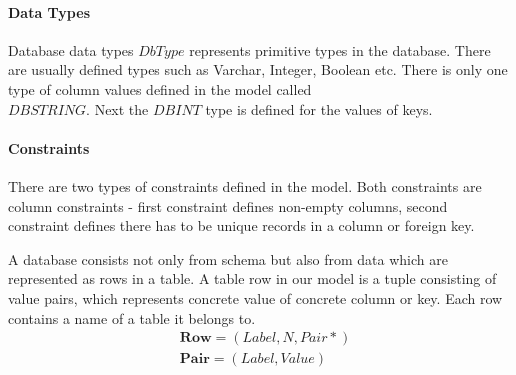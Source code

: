 \documentclass[runningheads]{comsis}
\begin{document}
\paragraph{Data Types} Database data types $DbType$ represents primitive types in the database. There are usually defined types such as Varchar, Integer, Boolean etc. There is only one type of column values defined in the model called \\ $DBSTRING$. Next the $DBINT$ type is defined for the values of keys.

\paragraph{Constraints} There are two types of constraints defined in the model. Both constraints are column constraints - first constraint defines non-empty columns, second constraint defines there has to be unique records in a column or foreign key.

A database consists not only from schema but also from data which are represented as rows in a table. A table row in our model is a tuple consisting of value pairs, which represents concrete value of concrete column or key. Each row contains a name of a table it belongs to.
\begin{align}
&	\mathbf{Row} = (Label, N, Pair*) \\
&	\mathbf{Pair} = (Label, Value) 
\end{align}

\end{document}
